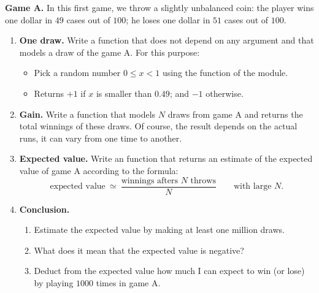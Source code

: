 \documentclass[11pt,class=report,crop=false]{standalone}
\begin{document}
\begin{activite}


\textbf{Game A.} In this first game, we throw a slightly unbalanced coin: the player wins one dollar in $49$ cases out of $100$; he loses one dollar in $51$ cases out of $100$.

\begin{enumerate}
  \item \textbf{One draw.}
  Write a  function that does not depend on any argument and that models a draw of the game A. For this purpose:
  \begin{itemize}
    \item Pick a random number $0 \le x < 1$ using the  function of the  module.
    \item Returns $+1$ if $x$ is smaller than $0.49$; and $-1$ otherwise.
  \end{itemize}
  
  
  \item \textbf{Gain.} Write a  function that models $N$ draws from game A and returns the total winnings of these draws. Of course, the result depends on the actual runs, it can vary from one time to another.
  
  \item \textbf{Expected value.} Write an  function that returns an estimate of the expected value of game A according to the formula:
   $$\text{expected value} \  \simeq \  \frac{\text{winnings afters $N$ throws}}{N} \qquad \text{with large $N$}.$$   
   
  \item \textbf{Conclusion.}
  \begin{enumerate}
    \item Estimate the expected value by making at least one million draws.
    \item What does it mean that the expected value is negative?
    \item Deduct from the expected value how much I can expect to win (or lose) by playing $1000$ times in game A.
  \end{enumerate}

\end{enumerate}

\end{activite}
  
\end{document}
